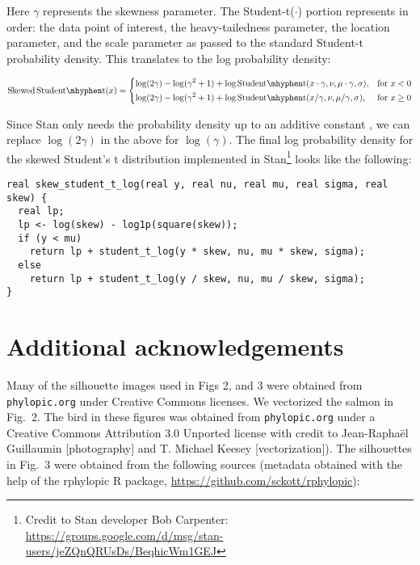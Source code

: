 \documentclass[12pt]{article}
\begin{document}
Here $\gamma$ represents the skewness parameter. The Student-t($\cdot$) portion represents in order: the data point of interest, the heavy-tailedness parameter, the location parameter, and the scale parameter as passed to the standard Student-t probability density. This translates to the log probability density:

\begin{equation}
\mathrm{Skewed\,Student\mhyphen t}(x) =
\begin{dcases}
  \log (2 \gamma) - \log(\gamma^2 + 1) +
  \log \mathrm{Student\mhyphen t}(x \cdot \gamma, \nu, \mu \cdot \gamma, \sigma),& \text{for } x < 0\\
  \log (2 \gamma) - \log(\gamma^2 + 1) +
  \log \mathrm{Student\mhyphen t}(x / \gamma, \nu, \mu / \gamma, \sigma),& \text{for } x \ge 0
\end{dcases}
\end{equation}

Since Stan only needs the probability density up to an additive
constant \cite{stan-manual2014}, we
can replace $\log(2 \gamma)$ in the above for $\log(\gamma)$. The final log
probability density for the skewed Student's t distribution implemented in
Stan\footnote{Credit to Stan developer Bob Carpenter:
\url{https://groups.google.com/d/msg/stan-users/jeZQnQRUsDs/BeqhicWm1GEJ}}
looks like the following:

\begin{verbatim}
real skew_student_t_log(real y, real nu, real mu, real sigma, real skew) {
  real lp;
  lp <- log(skew) - log1p(square(skew));
  if (y < mu)
    return lp + student_t_log(y * skew, nu, mu * skew, sigma);
  else
    return lp + student_t_log(y / skew, nu, mu / skew, sigma);
}
\end{verbatim}

\section{Additional acknowledgements}

Many of the silhouette images used in Figs 2, and 3 were obtained from
\texttt{phylopic.org} under Creative Commons licenses. We vectorized the
salmon in Fig.~2. The bird in these figures was obtained
from \texttt{phylopic.org} under a Creative Commons Attribution 3.0 Unported
license with credit to Jean-Raphaël Guillaumin {[}photography{]} and T.
Michael Keesey {[}vectorization{]}). The silhouettes in
Fig.~3 were obtained from the following sources (metadata
obtained with the help of the rphylopic R package,
\url{https://github.com/sckott/rphylopic}):
\end{document}
